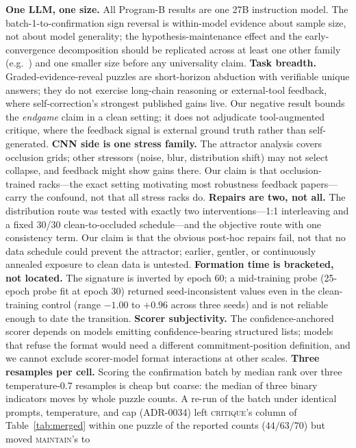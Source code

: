 \documentclass[10pt]{article}
\newcommand{\Mmaint}{\textsc{maintain}}
\newcommand{\Mcrit}{\textsc{critique}}
\begin{document}
\textbf{One LLM, one size.} All Program-B results are one 27B instruction
model. The batch-1-to-confirmation sign reversal is within-model
evidence about sample size, not about model generality; the
hypothesis-maintenance effect and the early-convergence decomposition
should be replicated across at least one other family
(e.g.\ \citealp{gemma2024}) and one smaller size before any
universality claim. \textbf{Task breadth.} Graded-evidence-reveal puzzles
are short-horizon abduction with verifiable unique answers; they do not
exercise long-chain reasoning or external-tool feedback, where
self-correction's strongest published gains live. Our negative result
bounds the \emph{endgame} claim in a clean setting; it does not
adjudicate tool-augmented critique, where the feedback signal is external
ground truth rather than self-generated. \textbf{CNN side is one stress
family.} The attractor analysis covers occlusion grids; other stressors
(noise, blur, distribution shift) may not select collapse, and feedback might
show gains there. Our claim is that occlusion-trained racks---the exact
setting motivating most robustness feedback papers---carry the confound,
not that all stress racks do. \textbf{Repairs are two, not all.} The
distribution route was tested with exactly two interventions---1:1
interleaving and a fixed 30/30 clean-to-occluded schedule---and the
objective route with one consistency term. Our claim is that the obvious
post-hoc repairs fail, not that no data schedule could prevent the
attractor; earlier, gentler, or continuously annealed exposure to clean
data is untested. \textbf{Formation time is bracketed, not located.} The
signature is inverted by epoch 60; a mid-training probe (25-epoch probe
fit at epoch 30) returned seed-inconsistent values even in the
clean-training control (range $-1.00$ to $+0.96$ across three seeds) and
is not reliable enough to date the transition. \textbf{Scorer subjectivity.} The
confidence-anchored scorer depends on models emitting confidence-bearing
structured lists; models that refuse the format would need a different
commitment-position definition, and we cannot exclude scorer-model format
interactions at other scales. \textbf{Three resamples per cell.} Scoring the
confirmation batch by median rank over three temperature-0.7 resamples is
cheap but coarse: the median of three binary indicators moves by whole
puzzle counts. A re-run of the batch under identical prompts, temperature,
and cap (ADR-0034) left \Mcrit{}'s column of Table~\ref{tab:merged} within
one puzzle of the reported counts ($44/63/70$) but moved \Mmaint{}'s to
\end{document}
